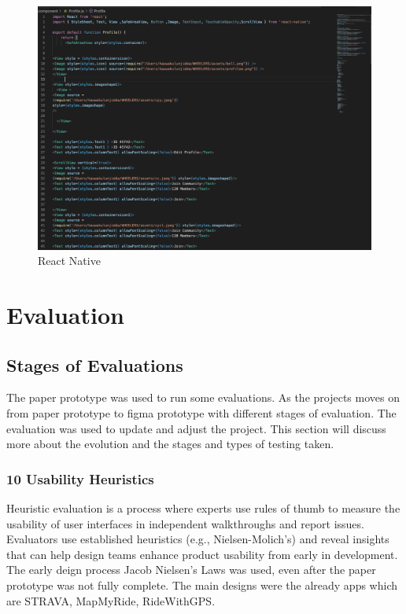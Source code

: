 \documentclass{l4proj}
\begin{document}
\begin{figure}
    \centering
     \includegraphics[width=1\textwidth]{images/98.png}
     \caption{React Native}
    \label{fig:my_label}
\end{figure}

\chapter{Evaluation} 
 

\section{Stages of Evaluations } 
The paper prototype was used to run some evaluations. As the projects moves on from paper prototype to figma prototype with different stages of evaluation. The evaluation was used to update and adjust the project. This section will discuss more about the evolution and the stages and types of testing taken.


\subsection{10 Usability Heuristics }
\label{HeuristicEvaluation}
 

Heuristic evaluation is a process where experts use rules of thumb to measure the usability of user interfaces in independent walkthroughs and report issues. Evaluators use established heuristics (e.g., Nielsen-Molich's) and reveal insights that can help design teams enhance product usability from early in development. The early deign process Jacob Nielsen's Laws was used, even after the paper prototype was not fully complete. The main designs were the already apps which are STRAVA, MapMyRide, RideWithGPS.
\end{document}
